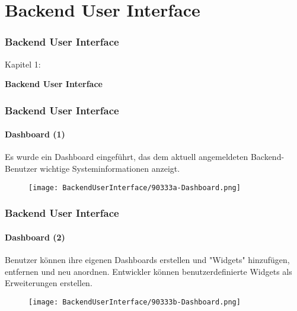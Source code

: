 %

\section{Backend User Interface}
\begin{frame}[fragile]
	\frametitle{Backend User Interface}

	\begin{center}\huge{Kapitel 1:}\end{center}
	\begin{center}\huge{\color{typo3darkgrey}\textbf{Backend User Interface}}\end{center}

\end{frame}


\begin{frame}[fragile]
	\frametitle{Backend User Interface}
	\framesubtitle{Dashboard (1)}

	Es wurde ein Dashboard eingeführt, das dem aktuell angemeldeten Backend-Benutzer wichtige Systeminformationen anzeigt.

	\begin{figure}
		\texttt{[image: BackendUserInterface/90333a-Dashboard.png]}
	\end{figure}

\end{frame}


\begin{frame}[fragile]
	\frametitle{Backend User Interface}
	\framesubtitle{Dashboard (2)}

	Benutzer können ihre eigenen Dashboards erstellen und "Widgets" hinzufügen, entfernen und neu anordnen.
	Entwickler können benutzerdefinierte Widgets als Erweiterungen erstellen.

	\begin{figure}
		\texttt{[image: BackendUserInterface/90333b-Dashboard.png]}
	\end{figure}

\end{frame}

